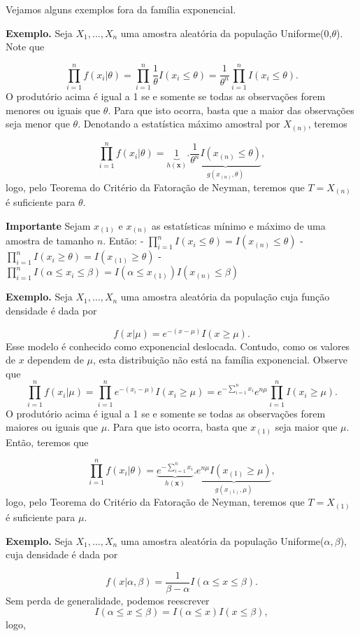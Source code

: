 \documentclass[
  letterpaper,
  DIV=11,
  numbers=noendperiod]{scrreprt}
\begin{document}
Vejamos alguns exemplos fora da família exponencial.

\textbf{Exemplo.} Seja \(X_1,\ldots,X_n\) uma amostra aleatória da
população Uniforme(0,\(\theta\)). Note que

\[\prod_{i=1}^n f(x_i|\theta)=\prod_{i=1}^n \frac{1}{\theta}I(x_i\leq \theta)=\frac{1}{\theta^n}\prod_{i=1}^{n}I(x_i\leq \theta).\]
O produtório acima é igual a 1 se e somente se todas as observações
forem menores ou iguais que \(\theta\). Para que isto ocorra, basta que
a maior das observações seja menor que \(\theta\). Denotando a
estatística máximo amostral por \(X_{(n)}\), teremos

\[\prod_{i=1}^nf(x_i|\theta)=\underbrace{1}_{h(\textbf{x})}.\underbrace{\frac{1}{\theta^n}I(x_{(n)}\leq\theta)}_{g(x_{(n)},\theta)},\]
logo, pelo Teorema do Critério da Fatoração de Neyman, teremos que
\(T=X_{(n)}\) é suficiente para \(\theta\).

\textbf{Importante} Sejam \(x_{(1)}\) e \(x_{(n)}\) as estatísticas
mínimo e máximo de uma amostra de tamanho \(n\). Então: -
\(\prod_{i=1}^n I(x_i\leq \theta)=I(x_{(n)}\leq \theta)\) -
\(\prod_{i=1}^n I(x_i\geq \theta)=I(x_{(1)}\geq \theta)\) -
\(\prod_{i=1}^n I(\alpha\leq x_i\leq \beta)=I(\alpha\leq x_{(1)})I(x_{(n)}\leq \beta)\)

\textbf{Exemplo.} Seja \(X_1,\ldots,X_n\) uma amostra aleatória da
população cuja função densidade é dada por

\[f(x|\mu)=e^{-(x-\mu)}I(x\geq \mu).\] Esse modelo é conhecido como
exponencial deslocada. Contudo, como os valores de \(x\) dependem de
\(\mu\), esta distribuição não está na família exponencial. Observe que
\[\prod_{i=1}^n f(x_i|\mu)=\prod_{i=1}^n e^{-(x_i-\mu)}I(x_i\geq \mu)=e^{-\sum_{i=1}^n x_i}e^{n\mu}\prod_{i=1}^{n}I(x_i\geq \mu).\]
O produtório acima é igual a 1 se e somente se todas as observações
forem maiores ou iguais que \(\mu\). Para que isto ocorra, basta que
\(x_{(1)}\) seja maior que \(\mu\). Então, teremos que

\[\prod_{i=1}^nf(x_i|\theta)=\underbrace{e^{-\sum_{i=1}^n x_i}}_{h(\textbf{x})}.\underbrace{e^{n\mu}I(x_{(1)}\geq \mu)}_{g(x_{(1)},\mu)},\]
logo, pelo Teorema do Critério da Fatoração de Neyman, teremos que
\(T=X_{(1)}\) é suficiente para \(\mu\).

\textbf{Exemplo.} Seja \(X_1,\ldots,X_n\) uma amostra aleatória da
população Uniforme(\(\alpha,\beta\)), cuja densidade é dada por

\[f(x|\alpha,\beta)=\frac{1}{\beta-\alpha}I(\alpha\leq x\leq \beta).\]
Sem perda de generalidade, podemos reescrever
\[I(\alpha\leq x\leq \beta)=I(\alpha\leq x)I(x\leq\beta),\] logo,
\end{document}

